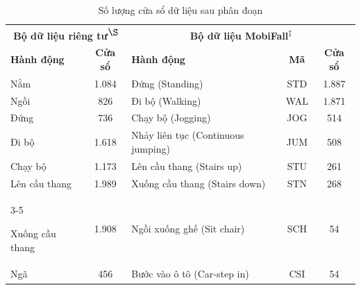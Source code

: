 \begin{table}[t]
    \centering
    \caption{Số lượng cửa sổ dữ liệu sau phân đoạn}
    \label{window_activity}
    \begin{tabular}{lc||lcc}\hline\hline
        \multicolumn{2}{c||}{\textbf{Bộ dữ liệu riêng tư}\textsuperscript{$\S$}} & \multicolumn{3}{c}{\textbf{Bộ dữ liệu MobiFall}\textsuperscript{$\ddag$}}\\
        \textbf{Hành động} & \textbf{Cửa sổ} & \textbf{Hành động} & \textbf{Mã} & \textbf{Cửa sổ}\\\hline
        
        \cellcolor{pink!50}Nằm & \cellcolor{pink!50}1.084 & \cellcolor{pink!50}Đứng (Standing) & \cellcolor{pink!50}STD & \cellcolor{pink!50}1.887\\
        
        \cellcolor{pink!50}Ngồi & \cellcolor{pink!50}826 & \cellcolor{pink!50}Đi bộ (Walking) & \cellcolor{pink!50}WAL & \cellcolor{pink!50}1.871\\
        
        \cellcolor{pink!50}Đứng & \cellcolor{pink!50}736 & \cellcolor{pink!50}Chạy bộ (Jogging) & \cellcolor{pink!50}JOG & \cellcolor{pink!50}514\\
        
        \cellcolor{pink!50}Đi bộ & \cellcolor{pink!50}1.618 & \cellcolor{pink!50}Nhảy liên tục (Continuous jumping) & \cellcolor{pink!50}JUM & \cellcolor{pink!50}508\\
        
        \cellcolor{pink!50}Chạy bộ & \cellcolor{pink!50}1.173 & \cellcolor{pink!50}Lên cầu thang (Stairs up) & \cellcolor{pink!50}STU & \cellcolor{pink!50}261\\
        
        \cellcolor{pink!50}Lên cầu thang & \cellcolor{pink!50}1.989 & \cellcolor{pink!50}Xuống cầu thang (Stairs down) & \cellcolor{pink!50}STN & \cellcolor{pink!50}268\\\cline{3-5}
        
        \cellcolor{pink!50}Xuống cầu thang & \cellcolor{pink!50}1.908 & \cellcolor{blue!20}Ngồi xuống ghế (Sit chair) & \cellcolor{blue!20}SCH & \cellcolor{blue!20}54\\
        
        \cellcolor{blue!20}Ngã & \cellcolor{blue!20}456 & \cellcolor{blue!20}Bước vào ô tô (Car-step in) & \cellcolor{blue!20}CSI & \cellcolor{blue!20}54\\
        

\end{tabular}
\end{table}
